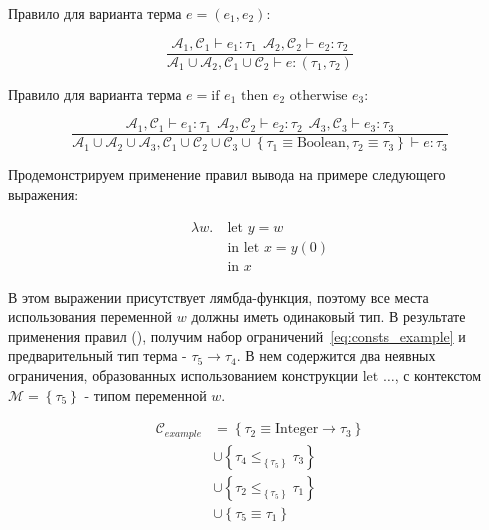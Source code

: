 Правило для варианта терма $e = (e_1, e_2)$:

\begin{equation}
    \label{eq:tuple_infer}
    \frac{
        \mathcal{A}_1, \mathcal{C}_1 \vdash e_1: \tau_1 ~~ \mathcal{A}_2, \mathcal{C}_2 \vdash e_2: \tau_2
    }{
        \mathcal{A}_1 \cup \mathcal{A}_2, \mathcal{C}_1 \cup \mathcal{C}_2 \vdash e: (\tau_1, \tau_2)
    }
\end{equation}

Правило для варианта терма $e = \text{if } e_1 \text{ then } e_2 \text{ otherwise } e_3$:

\begin{equation}
    \label{eq:if_infer}
    \frac{
        \mathcal{A}_1, \mathcal{C}_1 \vdash e_1: \tau_1 ~~ \mathcal{A}_2, \mathcal{C}_2 \vdash e_2: \tau_2 ~~ \mathcal{A}_3, \mathcal{C}_3 \vdash e_3: \tau_3
    }{
        \mathcal{A}_1 \cup \mathcal{A}_2 \cup \mathcal{A}_3, \mathcal{C}_1 \cup \mathcal{C}_2 \cup \mathcal{C}_3 \cup \left\{ \tau_1 \equiv \text{Boolean}, \tau_2 \equiv \tau_3 \right\} \vdash e: \tau_3
    }
\end{equation}

Продемонстрируем применение правил вывода на примере следующего выражения:

\begin{equation}
    \label{eq:expr_example}
    \begin{aligned}
        \lambda w. ~&\text{let } y = w \\
        &\text{in let } x = y(0) \\
        &\text{in } x
    \end{aligned}
\end{equation}

В этом выражении присутствует лямбда-функция, поэтому все места использования переменной $w$ должны иметь одинаковый тип.
В результате применения правил (), получим набор ограничений~\ref{eq:consts_example} и предварительный тип терма - $\tau_5 \to \tau_4$.
В нем содержится два неявных ограничения, образованных использованием конструкции $\text{let } \ldots$, с контекстом $\mathcal{M} = \left\{ \tau_5 \right\}$ - типом переменной $w$.

\begin{equation}
    \label{eq:consts_example}
    \begin{aligned}
        \mathcal{C}_{example} &= \left\{ \tau_2 \equiv \text{Integer} \to \tau_3 \right\} \\
        &\cup \left\{ \tau_4 \leq_{\left\{ \tau_5 \right\}} \tau_3 \right\} \\
        &\cup \left\{ \tau_2 \leq_{\left\{ \tau_5 \right\}} \tau_1 \right\} \\
        &\cup \left\{ \tau_5 \equiv \tau_1 \right\}
    \end{aligned}
\end{equation}


